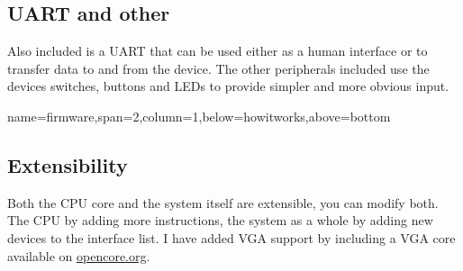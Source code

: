 \documentclass[a1paper,portrait]{baposter}
\begin{document}
\begin{poster}
\subsection{UART and other}

Also included is a UART that can be used either as a human interface or to transfer
data to and from the device. The other peripherals included use the devices switches,
buttons and LEDs to provide simpler and more obvious input.

{name=firmware,span=2,column=1,below=howitworks,above=bottom}{
\smaller
\subsection{Extensibility}
Both the CPU core and the system itself are extensible, you can modify both. The CPU by adding
more instructions, the system as a whole by adding new devices to the interface list. I have
added VGA support by including a VGA core available on \url{opencore.org}.
\subsection{}

}

\end{poster}
\end{document}
